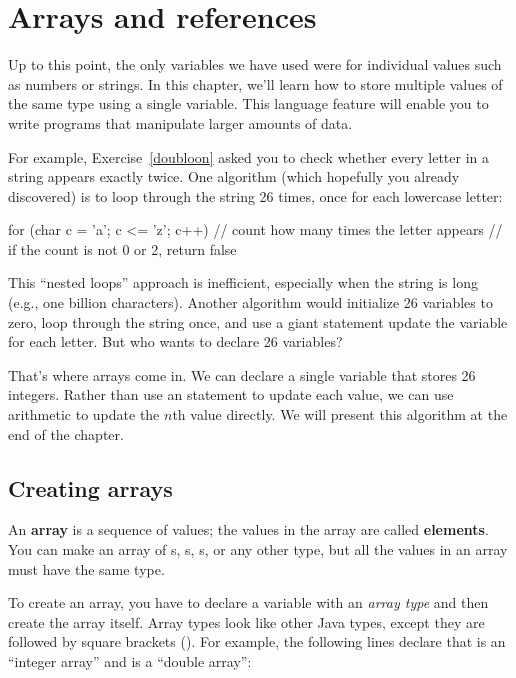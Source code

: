 \chapter{Arrays and references}

Up to this point, the only variables we have used were for individual values such as numbers or strings.
In this chapter, we'll learn how to store multiple values of the same type using a single variable.
This language feature will enable you to write programs that manipulate larger amounts of data.

For example, Exercise~\ref{doubloon} asked you to check whether every letter in a string appears exactly twice.
One algorithm (which hopefully you already discovered) is to loop through the string 26 times, once for each lowercase letter:

\begin{code}
for (char c = 'a'; c <= 'z'; c++) {
    // count how many times the letter appears
    // if the count is not 0 or 2, return false
}
\end{code}

This ``nested loops'' approach is inefficient, especially when the string is long (e.g., one billion characters).
Another algorithm would initialize 26 variables to zero, loop through the string once, and use a giant  statement update the variable for each letter.
But who wants to declare 26 variables?

That's where arrays come in.
We can declare a single variable that stores 26 integers.
Rather than use an  statement to update each value, we can use arithmetic to update the $n$th value directly.
We will present this algorithm at the end of the chapter.


\section{Creating arrays}


An {\bf array} is a sequence of values; the values in the array are called {\bf elements}.
You can make an array of s, s, s, or any other type, but all the values in an array must have the same type.


To create an array, you have to declare a variable with an {\em array type} and then create the array itself.
Array types look like other Java types, except they are followed by square brackets (\java{[]}).
For example, the following lines declare that  is an ``integer array'' and  is a ``double array'':

